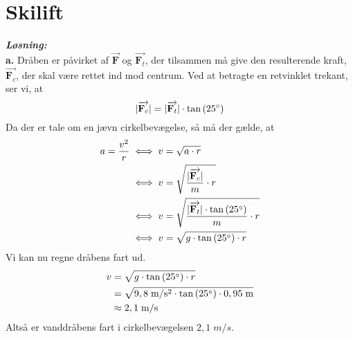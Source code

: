 \documentclass{report}
\newcommand{\sol}{\setlength{\parindent}{0cm}\textbf{\textit{Løsning:}}\setlength{\parindent}{1cm}}
\begin{document}
\section*{Skilift}
\sol \\
\textbf{a.}
Dråben er påvirket af $\overrightarrow{\textbf{F}} $ og $\overrightarrow{\textbf{F}_t} $, der tilsammen må give den resulterende kraft, $\overrightarrow{\textbf{F}_c} $, der skal være rettet ind mod centrum. 
Ved at betragte en retvinklet trekant, ser vi, at 
\[
|\overrightarrow{\textbf{F}_c} | = |\overrightarrow{\textbf{F}_t}|  \cdot \tan\left(25 \degree \right) 
\] 
Da der er tale om en jævn cirkelbevægelse, så må der gælde, at 
\begin{equation*}
\begin{split}
  a=\frac{v^2}{r} &\iff v = \sqrt{a \cdot r} \\
  &\iff v=\sqrt{\frac{|\overrightarrow{\textbf{F}_c}| }{m} \cdot r} \\
  &\iff v=\sqrt{\frac{|\overrightarrow{\textbf{F}_t}| \cdot \tan\left(25 \degree \right)  }{m} \cdot r} \\
  &\iff v=\sqrt{g \cdot \tan\left(25 \degree \right) \cdot r} 
\end{split}
\end{equation*}
Vi kan nu regne dråbens fart ud.
\begin{equation*}
\begin{split}
  v&=\sqrt{g \cdot \tan\left(25 \degree \right) \cdot r} \\
  &=\sqrt{9,8 \;\unit{m/s^2} \cdot \tan\left(25 \degree \right) \cdot 0,95 \;\unit{m}  } \\
  &\approx 2,1 \;\unit{m/s} 
\end{split}
\end{equation*}
Altså er vanddråbens fart i cirkelbevægelsen $2,1 \;\unit{m/s} $.
\end{document}
